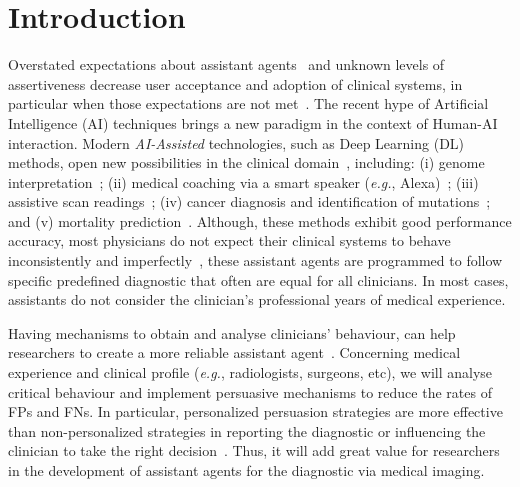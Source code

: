 \section{Introduction}
\label{sec:sec001}

Overstated expectations about assistant agents~\cite{https://doi.org/10.13140/rg.2.2.25412.68486, https://doi.org/10.13140/rg.2.2.33421.59360} and unknown levels of assertiveness decrease user acceptance and adoption of clinical systems, in particular when those expectations are not met~\cite{Kocielnik:2019:YAI:3290605.3300641}.
The recent hype of Artificial Intelligence (AI) techniques brings a new paradigm in the context of Human-AI interaction.
Modern {\it AI-Assisted} technologies, such as Deep Learning (DL) methods, open new possibilities in the clinical domain~\cite{topol2019high}, including:
(i) genome interpretation~\cite{sundaram2018predicting};
(ii) medical coaching via a smart speaker ({\it e.g.}, Alexa)~\cite{bickmore2018patient};
(iii) assistive scan readings~\cite{madani2018deep};
(iv) cancer diagnosis and identification of mutations~\cite{coudray2018classification}; and
(v) mortality prediction~\cite{ahmad2018death}.
Although, these methods exhibit good performance accuracy, most physicians do not expect their clinical systems to behave inconsistently and imperfectly~\cite{Kocielnik:2019:YAI:3290605.3300641}, these assistant agents are programmed to follow specific predefined diagnostic that often are equal for all clinicians.
In most cases, assistants do not consider the clinician's professional years of medical experience.


Having mechanisms to obtain and analyse clinicians' behaviour, can help researchers to create a more reliable assistant agent~\cite{Miao2019}.
Concerning medical experience and clinical profile ({\it e.g.}, radiologists, surgeons, etc), we will analyse critical behaviour and implement persuasive mechanisms to reduce the rates of FPs and FNs.
In particular, personalized persuasion strategies are more effective than non-personalized strategies in reporting the diagnostic or influencing the clinician to take the right decision~\cite{sonntag2016persuasive}.
Thus, it will add great value for researchers in the development of assistant agents for the diagnostic via medical imaging.

\clearpage

